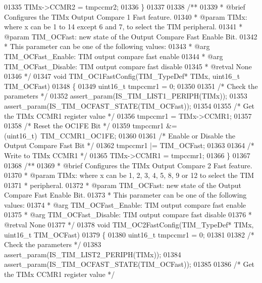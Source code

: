 \begin{DoxyCode}
01335   TIMx->CCMR2 = tmpccmr2;
01336 \}
01337 
01338 \textcolor{comment}{/**}
01339 \textcolor{comment}{  * @brief  Configures the TIMx Output Compare 1 Fast feature.}
01340 \textcolor{comment}{  * @param  TIMx: where x can be 1 to 14 except 6 and 7, to select the TIM peripheral.}
01341 \textcolor{comment}{  * @param  TIM\_OCFast: new state of the Output Compare Fast Enable Bit.}
01342 \textcolor{comment}{  *          This parameter can be one of the following values:}
01343 \textcolor{comment}{  *            @arg TIM\_OCFast\_Enable: TIM output compare fast enable}
01344 \textcolor{comment}{  *            @arg TIM\_OCFast\_Disable: TIM output compare fast disable}
01345 \textcolor{comment}{  * @retval None}
01346 \textcolor{comment}{  */}
01347 \textcolor{keywordtype}{void} TIM_OC1FastConfig(TIM\_TypeDef* TIMx, uint16\_t TIM\_OCFast)
01348 \{
01349   uint16\_t tmpccmr1 = 0;
01350 
01351   \textcolor{comment}{/* Check the parameters */}
01352   assert_param(IS\_TIM\_LIST1\_PERIPH(TIMx));
01353   assert_param(IS\_TIM\_OCFAST\_STATE(TIM\_OCFast));
01354 
01355   \textcolor{comment}{/* Get the TIMx CCMR1 register value */}
01356   tmpccmr1 = TIMx->CCMR1;
01357 
01358   \textcolor{comment}{/* Reset the OC1FE Bit */}
01359   tmpccmr1 &= (uint16\_t)~TIM_CCMR1_OC1FE;
01360 
01361   \textcolor{comment}{/* Enable or Disable the Output Compare Fast Bit */}
01362   tmpccmr1 |= TIM\_OCFast;
01363 
01364   \textcolor{comment}{/* Write to TIMx CCMR1 */}
01365   TIMx->CCMR1 = tmpccmr1;
01366 \}
01367 
01368 \textcolor{comment}{/**}
01369 \textcolor{comment}{  * @brief  Configures the TIMx Output Compare 2 Fast feature.}
01370 \textcolor{comment}{  * @param  TIMx: where x can be  1, 2, 3, 4, 5, 8, 9 or 12 to select the TIM }
01371 \textcolor{comment}{  *         peripheral.}
01372 \textcolor{comment}{  * @param  TIM\_OCFast: new state of the Output Compare Fast Enable Bit.}
01373 \textcolor{comment}{  *          This parameter can be one of the following values:}
01374 \textcolor{comment}{  *            @arg TIM\_OCFast\_Enable: TIM output compare fast enable}
01375 \textcolor{comment}{  *            @arg TIM\_OCFast\_Disable: TIM output compare fast disable}
01376 \textcolor{comment}{  * @retval None}
01377 \textcolor{comment}{  */}
01378 \textcolor{keywordtype}{void} TIM_OC2FastConfig(TIM\_TypeDef* TIMx, uint16\_t TIM\_OCFast)
01379 \{
01380   uint16\_t tmpccmr1 = 0;
01381 
01382   \textcolor{comment}{/* Check the parameters */}
01383   assert_param(IS\_TIM\_LIST2\_PERIPH(TIMx));
01384   assert_param(IS\_TIM\_OCFAST\_STATE(TIM\_OCFast));
01385 
01386   \textcolor{comment}{/* Get the TIMx CCMR1 register value */}

\end{DoxyCode}
